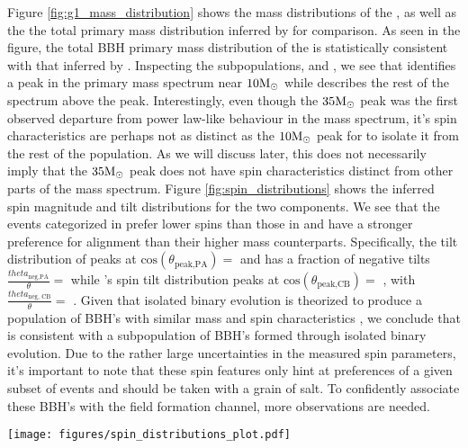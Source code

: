 
Figure \ref{fig:g1_mass_distribution} shows the mass distributions of the \base{}, as well as the the total primary mass distribution inferred by \brucepaper{} for comparison. As seen in the figure, the total BBH primary mass distribution of the \base{} is statistically consistent with that inferred by \brucepaper{}. Inspecting the subpopulations, \first{} and \contB{}, we see that \first{} identifies a peak in the primary mass spectrum near $10{\rm M}_\odot$ while \contB{} describes the rest of the spectrum above the peak. Interestingly, even though the $35{\rm M}_\odot$ peak was the first observed departure from power law-like behaviour in the mass spectrum, it's spin characteristics are perhaps not as distinct as the $10{\rm M}_\odot$ peak for \first{} to isolate it from the rest of the population. As we will discuss later, this does not necessarily imply that the $35{\rm M}_\odot$ peak does not have spin characteristics distinct from other parts of the mass spectrum. Figure \ref{fig:spin_distributions} shows the inferred spin magnitude and tilt distributions for the two components. We see that the events categorized in \first{} prefer lower spins than those in \contB{} and have a stronger preference for alignment than their higher mass counterparts. Specifically, the tilt distribution of \first{} peaks at $\text{cos}(\theta_\text{peak,PA})=$ \result{$\CIPlusMinus{\macros[CosTilt][Base][PeakA][max]}$} and has a fraction of negative tilts $\frac{theta_\text{neg,PA}}{\theta}=$ \result{$\CIPlusMinus{\macros[CosTilt][Base][PeakA][negfrac]}$} while \contB{}'s spin tilt distribution peaks at $\text{cos}(\theta_\text{peak,CB})=$ \result{$\CIPlusMinus{\macros[CosTilt][Base][ContinuumB][max]}$}, with $\frac{theta_\text{neg, CB}}{\theta} = $ \result{$\CIPlusMinus{\macros[CosTilt][Base][ContinuumB][negfrac]}$}. Given that isolated binary evolution is theorized to produce a population of BBH's with similar mass and spin characteristics , we conclude that \first{} is consistent with a subpopulation of BBH's formed through isolated binary evolution. Due to the rather large uncertainties in the measured spin parameters, it's important to note that these spin features only hint at preferences of a given subset of events and should be taken with a grain of salt. To confidently associate these BBH's with the field formation channel, more observations are needed. 

\begin{figure*}[ht!]
    \begin{centering}
        \texttt{[image: figures/spin\_distributions\_plot.pdf]}
        \caption{The marginal primary spin magnitude distribution}
        \label{fig:spin_distributions}
    \end{centering}
\end{figure*}


